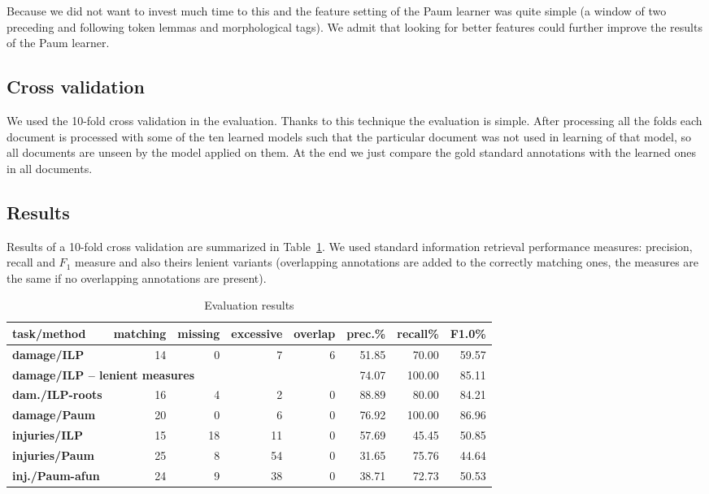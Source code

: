 Because we did not want to invest much time to this and the feature setting of the Paum learner was quite simple (a window of two preceding and following token lemmas and morphological tags). We admit that looking for better features could further improve the results of the Paum learner.

\subsection{Cross validation}
We used the 10-fold cross validation in the evaluation. Thanks to this technique the evaluation is simple. After processing all the folds each document is processed with some of the ten learned models such that the particular document was not used in learning of that model, so all documents are unseen by the model applied on them. At the end we just compare the gold standard annotations with the learned ones in all documents.

\subsection{Results}


Results of a 10-fold cross validation are summarized in Table~\ref{tab:EvaluationResults}. We used standard information retrieval performance measures: precision, recall and $F_1$ measure and also theirs lenient variants (overlapping annotations are added to the correctly matching ones, the measures are the same if no overlapping annotations are present).

\begin{table}[t]
	\centering
			
\begin{tabular}{|l||r|r|r|r|r|r|r|}
\hline
\textbf{task/method} & \textbf{matching} & \textbf{missing} & \textbf{excessive} & \textbf{overlap} & \textbf{prec.}\% & \textbf{recall}\% & \textbf{F1.0}\%\\
\hline
\hline
\textbf{damage/ILP} & 14 & 0 & 7 & 6 & 51.85 & 70.00 & 59.57\\
\hline
\multicolumn{5}{|l|}{\textbf{damage/ILP -- lenient measures}} & 74.07 & 100.00 & 85.11\\
\hline
\textbf{dam./ILP-roots} & 16 & 4 & 2 & 0 & 88.89 & 80.00 & 84.21\\
\hline
\textbf{damage/Paum} & 20 & 0 & 6 & 0 & 76.92 & 100.00 & 86.96\\
\hline
\hline
\textbf{injuries/ILP} & 15 & 18 & 11 & 0 & 57.69 & 45.45 & 50.85\\
\hline
\textbf{injuries/Paum} & 25 & 8 & 54 & 0 & 31.65 & 75.76 & 44.64\\
\hline
\textbf{inj./Paum-afun} & 24 & 9 & 38 & 0 & 38.71 & 72.73 & 50.53\\
\hline
\end{tabular}
						
	\caption{Evaluation results }
	\label{tab:EvaluationResults}
	\vspace{-0.80cm}
\end{table}

